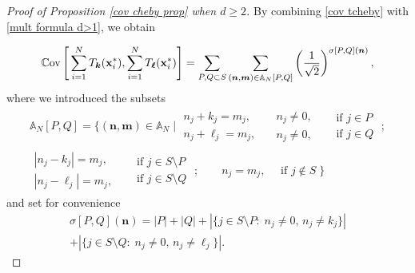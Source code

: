 \documentclass[a4paper,11pt]{article}
\numberwithin{equation}{section}
\theoremstyle{definition}
\newcommand{\bs}{\boldsymbol}
\newcommand{\bv}{\mathbf}
\renewcommand{\geq}{\geqslant}
\begin{document}
\begin{proof}[Proof of Proposition \ref{cov cheby prop} when $d\geq 2$]
By combining  \eqref{cov tcheby} with \eqref{mult formula d>1},   we obtain


\[
 \mathbb C{\rm ov}\left[\, \sum_{i=1}^NT_{\bs k}(\bv x_i^*),\sum_{i=1}^NT_{\bs \ell}(\bv x_i^*)\right] = \sum_{P,Q\subset S}\sum_{(\bs n,\bs m)\in \mathbb A_N[P,Q]}\left(\frac{1}{ \sqrt 2}\right)^{\sigma[P, Q](\bs n)},
\]
where we introduced the subsets
\begin{multline}
\label{def sets}
\mathbb A_N[P,Q]=
\Bigg\{(\bs n,\bs m)\in\mathbb A_N \;\Bigg| \;
\begin{matrix*}
n_j+k_j=m_j,\\
n_j+\ell_j=m_j,
\end{matrix*}
\quad
\begin{matrix*}
n_j\neq 0,\\
n_j\neq 0,
\end{matrix*}
\quad
\begin{matrix*}
\mbox{ if } j\in P\\
\mbox{ if } j\in Q
\end{matrix*} \; ;
\\
\begin{matrix*}
|n_j-k_j|=m_j,\\
|n_j-\ell_j|=m_j,
\end{matrix*}
\quad
\begin{matrix*}
\mbox{ if } j\in S\setminus P\\
\mbox{ if } j\in S\setminus Q
\end{matrix*}\; ;
\qquad
n_j=m_j,\quad \mbox{ if } j\notin S \;\Bigg\}
\end{multline}
and set for convenience
\begin{multline}
\label{def sigma}
\sigma[P,Q](\bs n)=| P | + | Q |
+|\big\{j\in S\setminus P :\; n_j\neq 0,\, n_j\neq k_j\big\}|\\+|\big\{j\in S\setminus Q :\; n_j\neq 0,\, n_j\neq \ell_j\big\}|.
\end{multline}


\end{proof}
\end{document}
